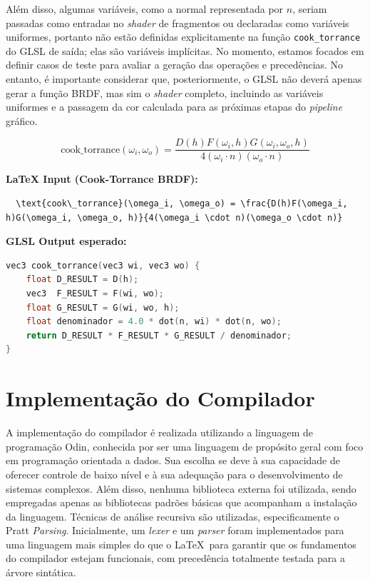 \documentclass[english, 
               brazil, 
               bsc] %
               {dcomp-abntex2}
\begin{document}
Além disso, algumas variáveis, como a normal representada por \( n \), seriam passadas como entradas no \textit{shader} de fragmentos ou declaradas como variáveis uniformes, portanto não estão definidas explicitamente na função \texttt{cook\_torrance} do GLSL de saída; elas são variáveis implícitas. No momento, estamos focados em definir casos de teste para avaliar a geração das operações e precedências. No entanto, é importante considerar que, posteriormente, o GLSL não deverá apenas gerar a função BRDF, mas sim o \textit{shader} completo, incluindo as variáveis uniformes e a passagem da cor calculada para as próximas etapas do \textit{pipeline} gráfico.


\begin{equation} \label{eq-cook-torrance}
  \text{cook\_torrance}(\omega_i, \omega_o) = \frac{D(h)F(\omega_i, h)G(\omega_i, \omega_o, h)}{4(\omega_i \cdot n)(\omega_o \cdot n)}
\end{equation}


\textbf{LaTeX Input (Cook-Torrance BRDF):}
\begin{codigo}[H]
\caption{Entrada em Latex}
\label{cod-input-latex}
\begin{lstlisting}
  \text{cook\_torrance}(\omega_i, \omega_o) = \frac{D(h)F(\omega_i, h)G(\omega_i, \omega_o, h)}{4(\omega_i \cdot n)(\omega_o \cdot n)}
\end{lstlisting}
\end{codigo}


\textbf{GLSL Output esperado:}
\begin{codigo}[H]
\caption{Saída em GLSL esperada}
\label{cod-glsl-esperado}
\begin{lstlisting}[language=C]
vec3 cook_torrance(vec3 wi, vec3 wo) {
    float D_RESULT = D(h);
    vec3  F_RESULT = F(wi, wo);
    float G_RESULT = G(wi, wo, h); 
    float denominador = 4.0 * dot(n, wi) * dot(n, wo);
    return D_RESULT * F_RESULT * G_RESULT / denominador;
}
\end{lstlisting}
\end{codigo}


\section{Implementação do Compilador} \label{compiladorimplementacao}


A implementação do compilador é realizada utilizando a linguagem de programação Odin, conhecida por ser uma linguagem de propósito geral com foco em programação orientada a dados. Sua escolha se deve à sua capacidade de oferecer controle de baixo nível e à sua adequação para o desenvolvimento de sistemas complexos. Além disso, nenhuma biblioteca externa foi utilizada, sendo empregadas apenas as bibliotecas padrões básicas que acompanham a instalação da linguagem. Técnicas de análise recursiva são utilizadas, especificamente o Pratt \textit{Parsing}. Inicialmente, um \textit{lexer} e um \textit{parser} foram implementados para uma linguagem mais simples do que o \LaTeX\  para garantir que os fundamentos do compilador estejam funcionais, com precedência totalmente testada para a árvore sintática.
\end{document}
